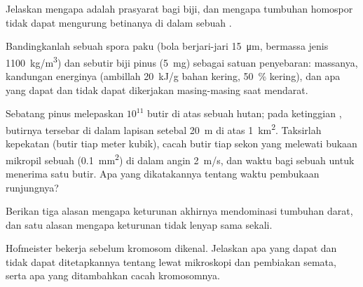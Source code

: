 \begin{exercise}[$\star\star$]\label{exo:b2:plant-life-cycles:8}
Jelaskan mengapa  adalah prasyarat bagi biji, dan mengapa
tumbuhan homospor tidak dapat mengurung  betinanya di dalam
sebuah .
\end{exercise}

\begin{exercise}[$\star\star$]\label{exo:b2:plant-life-cycles:9}
Bandingkanlah sebuah spora paku (bola berjari-jari \qty{15}{\micro m},
bermassa jenis \qty{1100}{kg/m^3}) dan sebutir biji pinus
(\qty{5}{mg}) sebagai satuan penyebaran: massanya, kandungan energinya
(ambillah \qty{20}{kJ/g} bahan kering, \qty{50}{\%} kering), dan apa
yang dapat dan tidak dapat dikerjakan masing-masing saat mendarat.
\end{exercise}

\begin{exercise}[$\star\star\star$]\label{exo:b2:plant-life-cycles:10}
Sebatang pinus melepaskan $10^{11}$ butir  di atas sebuah
hutan; pada ketinggian , butirnya tersebar di dalam
lapisan setebal \qty{20}{m} di atas \qty{1}{km^2}. Taksirlah kepekatan
 (butir tiap meter kubik), cacah butir tiap sekon yang
melewati bukaan mikropil sebuah  (\qty{0.1}{mm^2}) di dalam
angin \qty{2}{m/s}, dan waktu bagi sebuah  untuk menerima
satu butir. Apa yang dikatakannya tentang waktu pembukaan runjungnya?
\end{exercise}

\begin{exercise}[$\star\star\star$]\label{exo:b2:plant-life-cycles:11}
Berikan tiga alasan mengapa keturunan  akhirnya mendominasi
 tumbuhan darat, dan satu alasan mengapa keturunan 
tidak lenyap sama sekali.
\end{exercise}

\begin{exercise}[$\star\star\star$]\label{exo:b2:plant-life-cycles:12}
Hofmeister bekerja sebelum kromosom dikenal. Jelaskan apa yang dapat
dan tidak dapat ditetapkannya tentang 
lewat mikroskopi dan pembiakan semata, serta apa yang ditambahkan
cacah kromosomnya.
\end{exercise}

